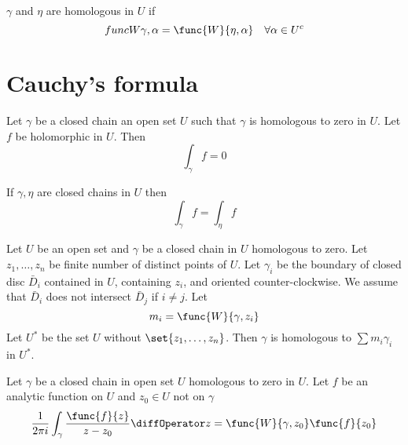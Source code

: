 \(\gamma\) and \(\eta\) are homologous in \(U\) if 
\begin{equation*}
    func{W}{\gamma, \alpha} = \func{W}{\eta, \alpha} \quad \forall \alpha \in U^c
\end{equation*}

\section{Cauchy's formula}
\begin{theorem}
    Let \(\gamma\) be a closed chain an open set \(U\) such that \(\gamma\) is homologous to zero in \(U\). Let \(f\) be holomorphic in \(U\). Then 
    \begin{equation*}
        \int_{\gamma} f = 0
    \end{equation*}
\end{theorem}

\begin{corollary}
    If \(\gamma, \eta\) are closed chains in \(U\) then 
    \begin{equation*}
        \int_{\gamma} f = \int_{\eta} f
    \end{equation*}
\end{corollary}
 
\begin{theorem}
    Let \(U\) be an open set and \(\gamma\) be a closed chain in \(U\) homologous to zero. Let \(z_1, \dots , z_n\) be finite number of distinct points of \(U\). Let \(\gamma_i\) be the boundary of closed disc \(\bar{D}_i\) contained in \(U\), containing \(z_i\), and oriented counter-clockwise. We assume that \(\bar{D}_i\) does not intersect \(\bar{D}_j\) if \(i \neq j\). Let 
    \begin{equation*}
        m_i = \func{W}{\gamma , z_i}
    \end{equation*}
    Let \(U^{\ast}\) be the set \(U\) without \(\set{z_1 ,\dots ,z_n}\). Then \(\gamma\) is homologous to \(\sum m_i \gamma_i \) in \(U^{\ast}\).
\end{theorem}

\begin{theorem}
    Let \(\gamma\) be a closed chain in open set \(U\) homologous to zero in \(U\). Let \(f\) be an analytic function on \(U\) and \(z_0 \in U\) not on \(\gamma\) 
    \begin{equation*}
        \frac{1}{2 \pi i} \int_{\gamma} \frac{\func{f}{z}}{z - z_0} \diffOperator z = \func{W}{\gamma , z_0} \func{f}{z_0}
    \end{equation*}
\end{theorem}

